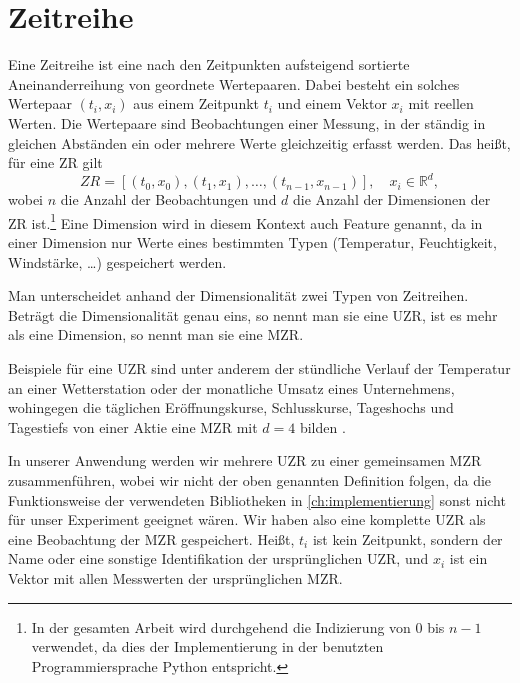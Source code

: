 \section{Zeitreihe}
Eine Zeitreihe ist eine nach den Zeitpunkten aufsteigend sortierte Aneinanderreihung von geordnete Wertepaaren. Dabei besteht ein solches Wertepaar $(t_i, x_i)$ aus einem Zeitpunkt $t_i$ und einem Vektor $x_i$ mit reellen Werten. Die Wertepaare sind Beobachtungen einer Messung, in der ständig in gleichen Abständen ein oder mehrere Werte gleichzeitig erfasst werden. Das heißt, für eine \ac{ZR} gilt 
\[ZR=[(t_0,x_0),(t_1,x_1),\ldots,(t_{n-1},x_{n-1})], \quad x_i \in \mathbb{R}^d,\]
wobei $n$ die Anzahl der Beobachtungen und $d$ die Anzahl der Dimensionen der \acs{ZR} ist.\footnote{In der gesamten Arbeit wird durchgehend die Indizierung von 0 bis $n-1$ verwendet, da dies der Implementierung in der benutzten Programmiersprache Python entspricht.}\label{foot:indexe} Eine Dimension wird in diesem Kontext auch Feature genannt, da in einer Dimension nur Werte eines bestimmten Typen (Temperatur, Feuchtigkeit, Windstärke, \dots) gespeichert werden.

Man unterscheidet anhand der Dimensionalität zwei Typen von Zeitreihen. Beträgt die Dimensionalität genau eins, so nennt man sie eine \ac{UZR}, ist es mehr als eine Dimension, so nennt man sie eine \ac{MZR}.

Beispiele für eine \acs{UZR} sind unter anderem der stündliche Verlauf der Temperatur an einer Wetterstation oder der monatliche Umsatz eines Unternehmens, wohingegen die täglichen Eröffnungskurse, Schlusskurse, Tageshochs und Tagestiefs von einer Aktie eine \acs{MZR} mit $d=4$ bilden \cite[Ch. 3.1]{compressionSurvey}.

In unserer Anwendung werden wir mehrere \acs{UZR} zu einer gemeinsamen \acs{MZR} zusammenführen, wobei wir nicht der oben genannten Definition folgen, da die Funktionsweise der verwendeten Bibliotheken in \autoref{ch:implementierung} sonst nicht für unser Experiment geeignet wären. Wir haben also eine komplette \acs{UZR} als eine Beobachtung der \acs{MZR} gespeichert. Heißt, $t_i$ ist kein Zeitpunkt, sondern der Name oder eine sonstige Identifikation der ursprünglichen \acs{UZR}, und $x_i$ ist ein Vektor mit allen Messwerten der ursprünglichen \acs{MZR}.